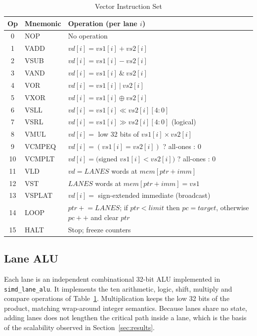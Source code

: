 \documentclass[conference]{IEEEtran}
\begin{document}
\begin{table}[!t]
\caption{Vector Instruction Set}
\label{tab:isa}
\centering
\scriptsize
\renewcommand{\arraystretch}{1.05}
\begin{tabular}{@{}c l p{4.9cm}@{}}
\toprule
\textbf{Op} & \textbf{Mnemonic} & \textbf{Operation (per lane $i$)}\\
\midrule
0 & NOP & No operation\\
1 & VADD & $vd[i]=vs1[i]+vs2[i]$\\
2 & VSUB & $vd[i]=vs1[i]-vs2[i]$\\
3 & VAND & $vd[i]=vs1[i]\ \&\ vs2[i]$\\
4 & VOR & $vd[i]=vs1[i]\ |\ vs2[i]$\\
5 & VXOR & $vd[i]=vs1[i]\oplus vs2[i]$\\
6 & VSLL & $vd[i]=vs1[i]\ll vs2[i][4{:}0]$\\
7 & VSRL & $vd[i]=vs1[i]\gg vs2[i][4{:}0]$ (logical)\\
8 & VMUL & $vd[i]=$ low 32 bits of $vs1[i]\times vs2[i]$\\
9 & VCMPEQ & $vd[i]=(vs1[i]=vs2[i])$ ? all-ones : 0\\
10 & VCMPLT & $vd[i]=($signed $vs1[i]<vs2[i])$ ? all-ones : 0\\
11 & VLD & $vd=\mathit{LANES}$ words at $\mathit{mem}[ptr+imm]$\\
12 & VST & $\mathit{LANES}$ words at $\mathit{mem}[ptr+imm]=vs1$\\
13 & VSPLAT & $vd[i]=$ sign-extended immediate (broadcast)\\
14 & LOOP & $ptr \mathrel{+}= \mathit{LANES}$; if $ptr<limit$ then $pc=target$, otherwise $pc\mathrel{+}{+}$ and clear $ptr$\\
15 & HALT & Stop; freeze counters\\
\bottomrule
\end{tabular}
\end{table}

\subsection{Lane ALU}
Each lane is an independent combinational 32-bit ALU implemented in \texttt{simd\_lane\_alu}. It implements the ten arithmetic, logic, shift, multiply and compare operations of Table~\ref{tab:isa}. Multiplication keeps the low 32 bits of the product, matching wrap-around integer semantics. Because lanes share no state, adding lanes does not lengthen the critical path inside a lane, which is the basis of the scalability observed in Section~\ref{sec:results}.
\end{document}
